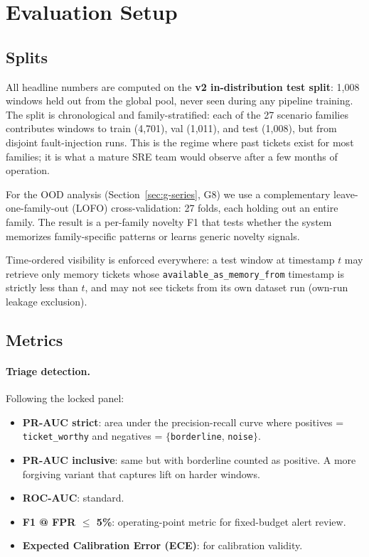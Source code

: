 \section{Evaluation Setup}
\label{sec:eval-setup}

\subsection{Splits}

All headline numbers are computed on the \textbf{v2 in-distribution test split}: 1{,}008 windows held out from the global pool, never seen during any pipeline training. The split is chronological and family-stratified: each of the 27 scenario families contributes windows to train (4{,}701), val (1{,}011), and test (1{,}008), but from disjoint fault-injection runs. This is the regime where past tickets exist for most families; it is what a mature SRE team would observe after a few months of operation.

For the OOD analysis (Section~\ref{sec:g-series}, G8) we use a complementary leave-one-family-out (LOFO) cross-validation: 27 folds, each holding out an entire family. The result is a per-family novelty F1 that tests whether the system memorizes family-specific patterns or learns generic novelty signals.

Time-ordered visibility is enforced everywhere: a test window at timestamp $t$ may retrieve only memory tickets whose \texttt{available\_as\_memory\_from} timestamp is strictly less than $t$, and may not see tickets from its own dataset run (own-run leakage exclusion).

\subsection{Metrics}

\paragraph{Triage detection.} Following the locked panel:

\begin{itemize}
\item \textbf{PR-AUC strict}: area under the precision-recall curve where positives = \texttt{ticket\_worthy} and negatives = $\{$\texttt{borderline}, \texttt{noise}$\}$.
\item \textbf{PR-AUC inclusive}: same but with borderline counted as positive. A more forgiving variant that captures lift on harder windows.
\item \textbf{ROC-AUC}: standard.
\item \textbf{F1 @ FPR $\leq$ 5\%}: operating-point metric for fixed-budget alert review.
\item \textbf{Expected Calibration Error (ECE)}: for calibration validity.
\end{itemize}

